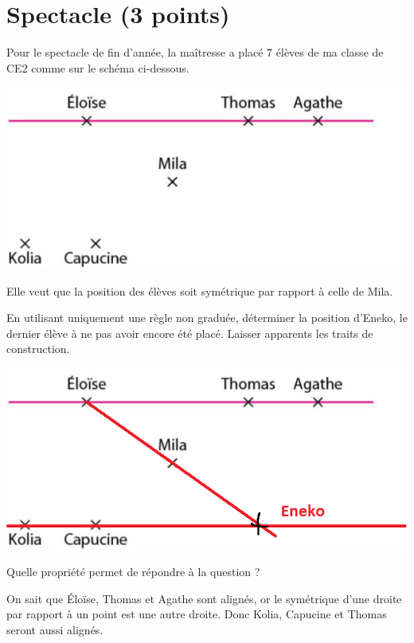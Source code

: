 \section{Spectacle (3 points)}

Pour le spectacle de fin d'année, la maîtresse a placé 7 élèves de ma classe de CE2 comme sur le schéma ci-dessous.

\begin{center}
	\includegraphics[scale=0.5]{img/spectacle}
\end{center}

Elle veut que la position des élèves soit symétrique par rapport à celle de Mila.

\begin{questions}
	\question[1\half] En utilisant uniquement une règle non graduée, déterminer la position d'Eneko, le dernier élève à ne pas avoir encore été placé. Laisser apparents les traits de construction.
	
	\begin{solution}
		\begin{center}
			\includegraphics[scale=0.5]{img/spectacle_corr}
		\end{center}
	\end{solution}
	
	\question[1\half] Quelle propriété permet de répondre à la question ?
	\begin{solution}
		On sait que \'Eloïse, Thomas et Agathe sont alignés,
		or le symétrique d'une droite par rapport à un point est une autre droite. 
		Donc Kolia, Capucine et Thomas seront aussi alignés.
	\end{solution}
\end{questions}